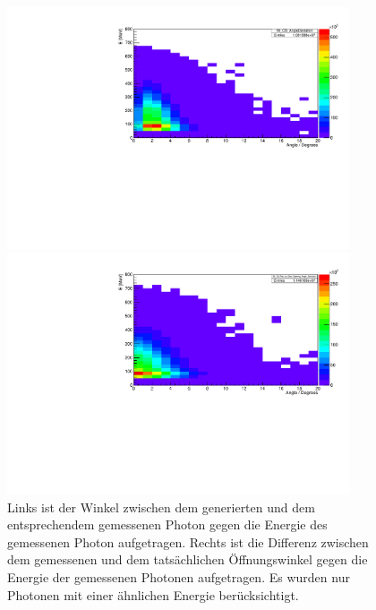 \documentclass[a4paper,11pt,oneside,final,german,openbib,pdftex]{scrbook}
\begin{document}
{\begin{figure}[h!]
	\centering
	\begin{minipage}{0.45\textwidth}
		\centering
		\includegraphics[width=0.9\textwidth]{20171804TrueCandsAngleDeviation}
		
	\end{minipage}
	\hfill
	\begin{minipage}{0.45\textwidth}
		\centering
		\includegraphics[width=0.9\textwidth]{20171904RecGenOpeningAngleDeviation}
	\end{minipage}
	\caption{Links ist der Winkel zwischen dem generierten und dem entsprechendem gemessenen Photon gegen die Energie des gemessenen Photon aufgetragen. Rechts ist die Differenz zwischen dem gemessenen und dem tats\"achlichen \"Offnungswinkel gegen die Energie der gemessenen Photonen aufgetragen. Es wurden nur Photonen mit einer \"ahnlichen Energie ber\"ucksichtigt.}
	\label{fig:Abweichung-Winkel-Oeffnungswinkel}


\end{figure}}
\end{document}
